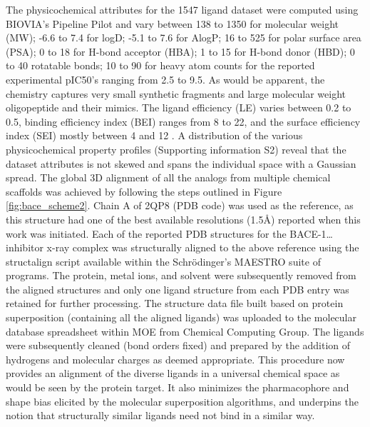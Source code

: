 The physicochemical attributes for the 1547 ligand dataset were computed using BIOVIA’s Pipeline Pilot \cite{systemes2016biovia} and vary between 138 to 1350 for molecular weight (MW); -6.6 to 7.4 for logD; -5.1 to 7.6 for AlogP; 16 to 525 for polar surface area (PSA); 0 to 18 for H-bond acceptor (HBA); 1 to 15 for H-bond donor (HBD); 0 to 40 rotatable bonds; 10 to 90 for heavy atom counts for the reported experimental pIC50’s ranging from 2.5 to 9.5.  As would be apparent, the chemistry captures very small synthetic fragments and large molecular weight oligopeptide and their mimics.  The ligand efficiency (LE) varies between 0.2 to 0.5, binding efficiency index (BEI) ranges from 8 to 22, and the surface efficiency index (SEI) mostly between 4 and 12 \cite{abad2010ligand}.  A distribution of the various physicochemical property profiles (Supporting information S2) reveal that the dataset attributes is not skewed and spans the individual space with a Gaussian spread.  
The global 3D alignment of all the analogs from multiple chemical scaffolds was achieved by following the steps outlined in Figure \ref{fig:bace_scheme2}.  Chain A of 2QP8 (PDB code) was used as the reference, as this structure had one of the best available resolutions (1.5Å) reported when this work was initiated.  Each of the reported PDB structures for the BACE-1…inhibitor x-ray complex was structurally aligned to the above reference using the structalign script available within the Schrödinger’s MAESTRO \cite{maestrorelease20142} suite of programs.  The protein, metal ions, and solvent were subsequently removed from the aligned structures and only one ligand structure from each PDB entry was retained for further processing.  The structure data file built based on protein superposition (containing all the aligned ligands) was uploaded to the molecular database spreadsheet within MOE \cite{moeversion2012chemical} from Chemical Computing Group.  The ligands were subsequently cleaned (bond orders fixed) and prepared by the addition of hydrogens and molecular charges as deemed appropriate.  This procedure now provides an alignment of the diverse ligands in a universal chemical space as would be seen by the protein target.  It also minimizes the pharmacophore and shape bias elicited by the molecular superposition algorithms, and underpins the notion that structurally similar ligands need not bind in a similar way. \cite{subramanian2012integrated}

